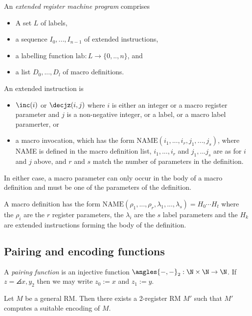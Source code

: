 \documentclass{article}
\begin{document}
\begin{definition*}[ERM]
	An \emph{extended register machine program} comprises
	\begin{itemize}
		\item A set $L$ of labels,
		\item a sequence $I_0,...,I_{n-1}$ of extended instructions,
		\item a labelling function $\text{lab}:L\to\{0,..,n\}$, and
		\item a list $D_0,...,D_l$ of macro definitions.
	\end{itemize}
	An extended instruction is
	\begin{itemize}
		\item $\inc(i)$ or $\decjz(i,j)$ where $i$ is either an integer or a macro
		      register parameter and $j$ is a non-negative integer, or a label, or
		      a macro label paramerter, or
		\item a macro invocation, which has the form $\text{NAME}(i_1,...,i_r,j_1,...,j_s)$,
		      where NAME is defined in the macro definition list, $i_1,...,i_r$ and $j_1,...j_s$
		      are as for $i$ and $j$ above, and $r$ and $s$ match the number of parameters
		      in the definition.
	\end{itemize}
	In either case, a macro parameter can only occur in the body of a macro definition
	and must be one of the parameters of the definition.

	A macro definition has the form $\text{NAME}(\rho_1,...,\rho_r,\lambda_1,...,\lambda_s)=H_0\cdots H_t$
	where the $\rho_i$ are the $r$ register parameters, the $\lambda_i$ are the $s$
	label parameters and the $H_k$ are extended instructions forming the body of the
	definition.
\end{definition*}

\subsection{Pairing and encoding functions}

\begin{definition*}
	A \emph{pairing function} is an injective function $\angles{-,-}_2:\N\times\N\to\N$.
	If $z=\angles{x,y}_2$ then we may write $z_0:=x$ and $z_1:=y$.
\end{definition*}

\begin{theorem*}
	Let $M$ be a general RM. Then there exists a 2-register RM $M'$ such that
	$M'$ computes a suitable encoding of $M$.
\end{theorem*}
\end{document}
